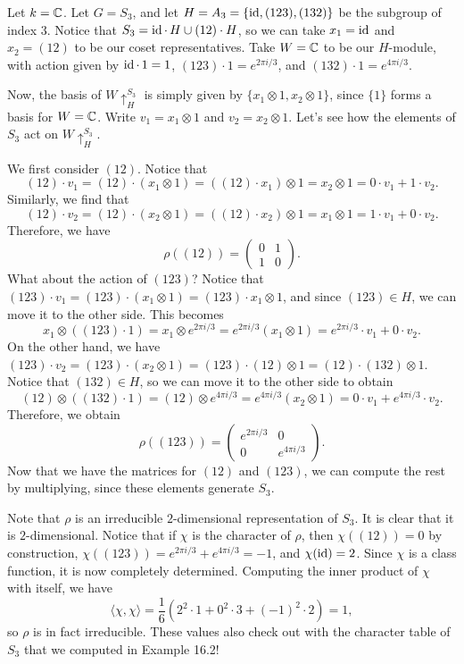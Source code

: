 \begin{exmp}{}
    Let $k = \mathbb{C}$. Let $G = S_3$, and let $H = A_3 = \{\operatorname{id}, (123), (132)\}$ be the 
    subgroup of index $3$. Notice that $S_3 = \operatorname{id} \cdot\,H \cup (12) \cdot H$, 
    so we can take $x_1 = \operatorname{id}$ and $x_2 = (12)$ to be our coset representatives. 
    Take $W = \mathbb{C}$ to be our $H$-module, with action given by 
    $\operatorname{id} \cdot\,1 = 1$, $(123) \cdot 1 = e^{2\pi i/3}$, 
    and $(132) \cdot 1 = e^{4\pi i/3}$.

    Now, the basis of $W \uparrow_H^{S_3}$ is simply given by $\{x_1 \otimes 1, 
    x_2 \otimes 1\}$, since $\{1\}$ forms a basis for $W = \mathbb{C}$. Write 
    $v_1 = x_1 \otimes 1$ and $v_2 = x_2 \otimes 1$. Let's see how the elements 
    of $S_3$ act on $W \uparrow_H^{S_3}$. 

    We first consider $(12)$. Notice that 
    \[ (12) \cdot v_1 = (12) \cdot (x_1 \otimes 1) = 
    ((12) \cdot x_1) \otimes 1 = x_2 \otimes 1 = 0 \cdot v_1 + 1 \cdot v_2. \] 
    Similarly, we find that 
    \[ (12) \cdot v_2 = (12) \cdot (x_2 \otimes 1) = 
    ((12) \cdot x_2) \otimes 1 = x_1 \otimes 1 = 1 \cdot v_1 + 0 \cdot v_2. \] 
    Therefore, we have 
    \[ \rho((12)) = \begin{pmatrix}
        0 & 1 \\ 
        1 & 0 
    \end{pmatrix}. \] 
    \newpage 
    What about the action of $(123)$? Notice that $(123) \cdot v_1 = 
    (123) \cdot (x_1 \otimes 1) = (123) \cdot x_1 \otimes 1$, and since 
    $(123) \in H$, we can move it to the other side. This becomes 
    \[ x_1 \otimes ((123) \cdot 1) = x_1 \otimes e^{2\pi i/3} = 
    e^{2\pi i/3} (x_1 \otimes 1) = e^{2\pi i/3} \cdot v_1 + 0 \cdot v_2. \] 
    On the other hand, we have $(123) \cdot v_2 = (123) \cdot (x_2 \otimes 1) 
    = (123) \cdot (12) \otimes 1 = (12) \cdot (132) \otimes 1$. Notice that 
    $(132) \in H$, so we can move it to the other side to obtain 
    \[ (12) \otimes ((132) \cdot 1) = (12) \otimes e^{4\pi i/3} 
    = e^{4\pi i/3} (x_2 \otimes 1) = 0 \cdot v_1 + e^{4\pi i/3} \cdot v_2. \] 
    Therefore, we obtain 
    \[ \rho((123)) = \begin{pmatrix}
        e^{2\pi i/3} & 0 \\ 
        0 & e^{4\pi i/3}
    \end{pmatrix}. \] 
    Now that we have the matrices for $(12)$ and $(123)$, we can compute the 
    rest by multiplying, since these elements generate $S_3$. 

    Note that $\rho$ is an irreducible $2$-dimensional representation of $S_3$. 
    It is clear that it is $2$-dimensional. Notice that if $\chi$ is the 
    character of $\rho$, then $\chi((12)) = 0$ by construction, 
    $\chi((123)) = e^{2\pi i/3} + e^{4\pi i/3} = -1$, and $\chi(\operatorname{id}) = 2$. Since 
    $\chi$ is a class function, it is now completely determined. Computing the 
    inner product of $\chi$ with itself, we have 
    \[ \langle \chi, \chi \rangle = \frac{1}{6}(2^2 \cdot 1 + 0^2 \cdot 3 
    + (-1)^2 \cdot 2) = 1, \] 
    so $\rho$ is in fact irreducible. These values also check out with the 
    character table of $S_3$ that we computed in Example 16.2!
\end{exmp}

